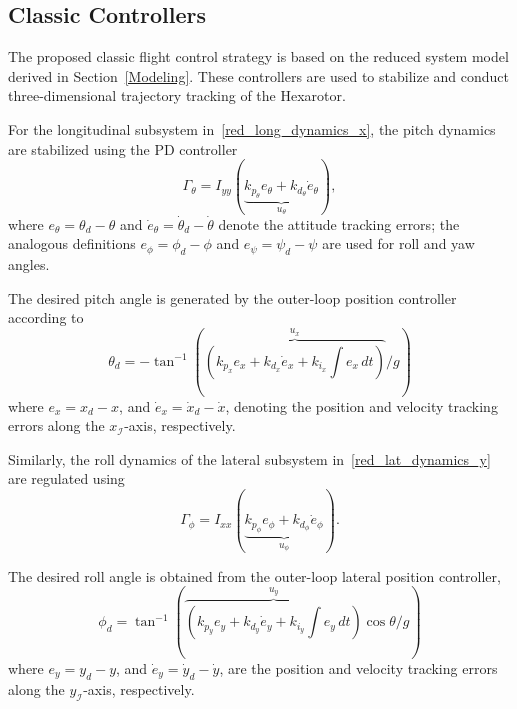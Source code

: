\documentclass[conference]{IEEEtran}
\begin{document}
\subsection{Classic Controllers}\label{Control_Simulink}


The proposed classic flight control strategy is based on the reduced system model derived in Section~\ref{Modeling}. These controllers are used to stabilize and conduct three-dimensional trajectory tracking of the Hexarotor.

For the longitudinal subsystem in~\eqref{red_long_dynamics_x}, the pitch dynamics are stabilized using the PD controller
\begin{equation}
\Gamma_\theta
=
I_{yy}
(\underbrace{
k_{p_\theta}e_\theta
+k_{d_\theta}\dot{e}_\theta}_{u_\theta}
),
\end{equation}
where $e_\theta=\theta_d-\theta$ and $\dot e_\theta=\dot{\theta}_d-\dot{\theta}$ denote the attitude tracking errors; the analogous definitions $e_\phi=\phi_d-\phi$ and $e_\psi=\psi_d-\psi$ are used for roll and yaw angles.

The desired pitch angle is generated by the outer-loop position controller according to
%
\begin{equation}\label{eq:thetad}
\theta_d
=
-\tan^{-1}\left({\overbrace{ \left(k_{p_x}e_x + k_{d_x}\dot e_x + k_{i_x}\int e_x\,dt\right)}^{u_x}}/{g}\right)
\end{equation}
%
where $e_x=x_d-x$, and $\dot e_x=\dot x_d-\dot x$, denoting the position and velocity tracking errors along the $x_\mathcal{I}$-axis, respectively.

Similarly, the roll dynamics of the lateral subsystem in~\eqref{red_lat_dynamics_y} are regulated using
\begin{equation}
\Gamma_\phi
=
I_{xx}
(\underbrace{
k_{p_\phi}e_\phi
+k_{d_\phi}\dot{e}_\phi
}_{u_\phi}).
\end{equation}

The desired roll angle is obtained from the outer-loop lateral position controller,
%
\begin{equation}\label{eq:phid}
\phi_d
=
\tan^{-1}\left({\overbrace{\left(k_{p_y}e_y+ k_{d_y}\dot e_y+ k_{i_y}\int e_y\,dt\right)}^{u_y}\cos\theta}/{g}\right)
\end{equation}
%
where $e_y=y_d-y$, and $\dot e_y=\dot y_d-\dot y$, are the position and velocity tracking errors along the $y_\mathcal{I}$-axis, respectively.
\end{document}
